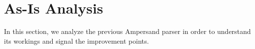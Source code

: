 
\section{As-Is Analysis}
\label{sec:analysis}
In this section, we analyze the previous Ampersand parser in order to understand its workings and signal the improvement points.






